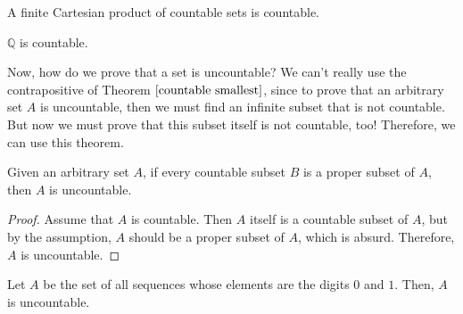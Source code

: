 \documentclass{article}
\begin{document}
    \begin{theorem}
    A finite Cartesian product of countable sets is countable. 
    \end{theorem}

    \begin{corollary}
    $\mathbb{Q}$ is countable. 
    \end{corollary}

    Now, how do we prove that a set is uncountable? We can't really use the contrapositive of Theorem $\ref{countable smallest}$, since to prove that an arbitrary set $A$ is uncountable, then we must find an infinite subset that is not countable. But now we must prove that this subset itself is not countable, too! Therefore, we can use this theorem. 

    \begin{theorem}
    Given an arbitrary set $A$, if every countable subset $B$ is a proper subset of $A$, then $A$ is uncountable. 
    \end{theorem}
    \begin{proof}
    Assume that $A$ is countable. Then $A$ itself is a countable subset of $A$, but by the assumption, $A$ should be a proper subset of $A$, which is absurd. Therefore, $A$ is uncountable. 
    \end{proof}

    \begin{theorem}
    Let $A$ be the set of all sequences whose elements are the digits $0$ and $1$. Then, $A$ is uncountable. 
    \end{theorem}
\end{document}
